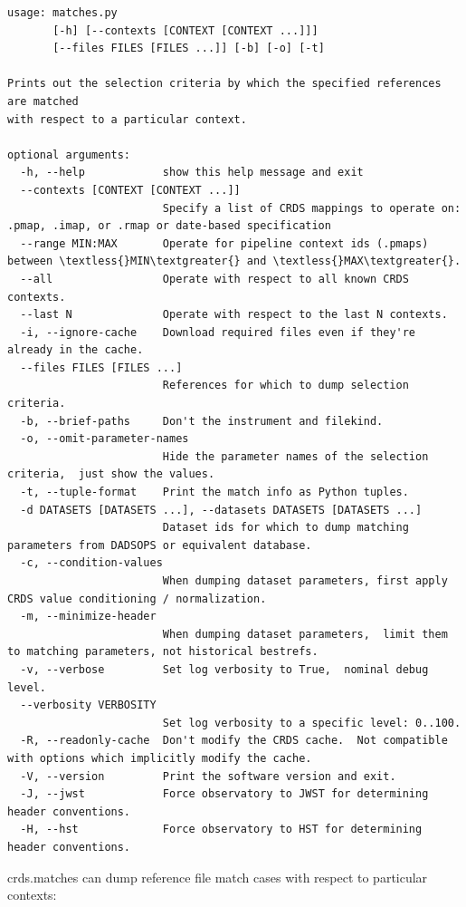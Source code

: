 \documentclass[letterpaper,10pt,english]{sphinxmanual}
\begin{document}
\begin{Verbatim}[commandchars=\\\{\}]
usage: matches.py
       [-h] [--contexts [CONTEXT [CONTEXT ...]]]
       [--files FILES [FILES ...]] [-b] [-o] [-t]

Prints out the selection criteria by which the specified references are matched
with respect to a particular context.

optional arguments:
  -h, --help            show this help message and exit
  --contexts [CONTEXT [CONTEXT ...]]
                        Specify a list of CRDS mappings to operate on: .pmap, .imap, or .rmap or date-based specification
  --range MIN:MAX       Operate for pipeline context ids (.pmaps) between \textless{}MIN\textgreater{} and \textless{}MAX\textgreater{}.
  --all                 Operate with respect to all known CRDS contexts.
  --last N              Operate with respect to the last N contexts.
  -i, --ignore-cache    Download required files even if they're already in the cache.
  --files FILES [FILES ...]
                        References for which to dump selection criteria.
  -b, --brief-paths     Don't the instrument and filekind.
  -o, --omit-parameter-names
                        Hide the parameter names of the selection criteria,  just show the values.
  -t, --tuple-format    Print the match info as Python tuples.
  -d DATASETS [DATASETS ...], --datasets DATASETS [DATASETS ...]
                        Dataset ids for which to dump matching parameters from DADSOPS or equivalent database.
  -c, --condition-values
                        When dumping dataset parameters, first apply CRDS value conditioning / normalization.
  -m, --minimize-header
                        When dumping dataset parameters,  limit them to matching parameters, not historical bestrefs.
  -v, --verbose         Set log verbosity to True,  nominal debug level.
  --verbosity VERBOSITY
                        Set log verbosity to a specific level: 0..100.
  -R, --readonly-cache  Don't modify the CRDS cache.  Not compatible with options which implicitly modify the cache.
  -V, --version         Print the software version and exit.
  -J, --jwst            Force observatory to JWST for determining header conventions.
  -H, --hst             Force observatory to HST for determining header conventions.
\end{Verbatim}

crds.matches can dump reference file match cases with respect to particular contexts:
\end{document}

